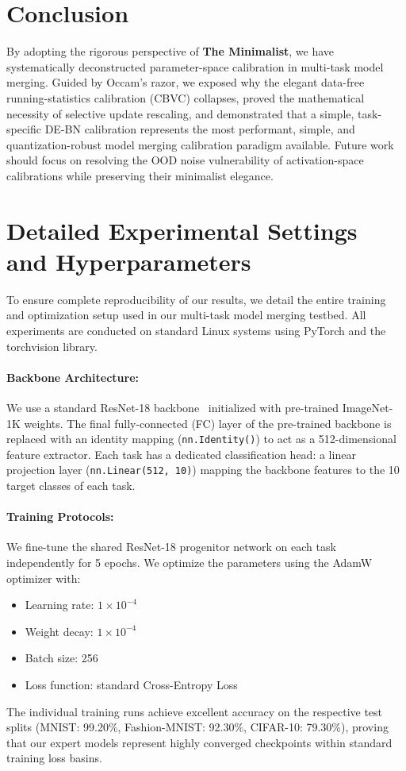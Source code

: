 \documentclass{article}
\begin{document}
\section{Conclusion}
\label{sec:conclusion}
By adopting the rigorous perspective of \textbf{The Minimalist}, we have systematically deconstructed parameter-space calibration in multi-task model merging. Guided by Occam's razor, we exposed why the elegant data-free running-statistics calibration (CBVC) collapses, proved the mathematical necessity of selective update rescaling, and demonstrated that a simple, task-specific DE-BN calibration represents the most performant, simple, and quantization-robust model merging calibration paradigm available. Future work should focus on resolving the OOD noise vulnerability of activation-space calibrations while preserving their minimalist elegance.




\clearpage
\appendix
\section{Detailed Experimental Settings and Hyperparameters}
\label{sec:appendix_hyperparameters}
To ensure complete reproducibility of our results, we detail the entire training and optimization setup used in our multi-task model merging testbed. All experiments are conducted on standard Linux systems using PyTorch and the torchvision library.

\paragraph{Backbone Architecture:}
We use a standard ResNet-18 backbone~\cite{he2016deep} initialized with pre-trained ImageNet-1K weights. The final fully-connected (FC) layer of the pre-trained backbone is replaced with an identity mapping (\texttt{nn.Identity()}) to act as a 512-dimensional feature extractor. Each task has a dedicated classification head: a linear projection layer (\texttt{nn.Linear(512, 10)}) mapping the backbone features to the 10 target classes of each task.

\paragraph{Training Protocols:}
We fine-tune the shared ResNet-18 progenitor network on each task independently for 5 epochs. We optimize the parameters using the AdamW optimizer with:
\begin{itemize}
    \item Learning rate: $1 \times 10^{-4}$
    \item Weight decay: $1 \times 10^{-4}$
    \item Batch size: 256
    \item Loss function: standard Cross-Entropy Loss
\end{itemize}
The individual training runs achieve excellent accuracy on the respective test splits (MNIST: 99.20\%, Fashion-MNIST: 92.30\%, CIFAR-10: 79.30\%), proving that our expert models represent highly converged checkpoints within standard training loss basins.
\end{document}
